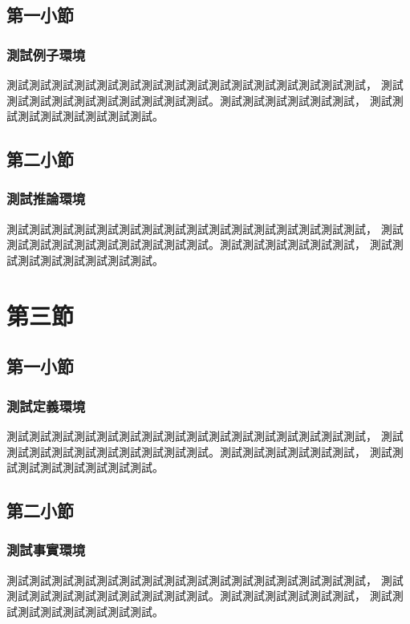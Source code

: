 \documentclass[10pt,serif,t]{beamer}
\begin{document}
\subsection{第一小節}

\begin{frame}
  \frametitle{測試例子環境}
  \begin{example}
    測試測試測試測試測試測試測試測試測試測試測試測試測試測試測試測試，
    測試測試測試測試測試測試測試測試測試測試。測試測試測試測試測試測試，
    測試測試測試測試測試測試測試測試。
  \end{example}
\end{frame}

\subsection{第二小節}

\begin{frame}
  \frametitle{測試推論環境}
  \begin{corollary}
    測試測試測試測試測試測試測試測試測試測試測試測試測試測試測試測試，
    測試測試測試測試測試測試測試測試測試測試。測試測試測試測試測試測試，
    測試測試測試測試測試測試測試測試。
  \end{corollary}
\end{frame}

\section{第三節}

\subsection{第一小節}

\begin{frame}
  \frametitle{測試定義環境}
  \begin{definition}
    測試測試測試測試測試測試測試測試測試測試測試測試測試測試測試測試，
    測試測試測試測試測試測試測試測試測試測試。測試測試測試測試測試測試，
    測試測試測試測試測試測試測試測試。
  \end{definition}
\end{frame}

\subsection{第二小節}

\begin{frame}
  \frametitle{測試事實環境}
  \begin{fact}
    測試測試測試測試測試測試測試測試測試測試測試測試測試測試測試測試，
    測試測試測試測試測試測試測試測試測試測試。測試測試測試測試測試測試，
    測試測試測試測試測試測試測試測試。
  \end{fact}
\end{frame}
\end{document}
